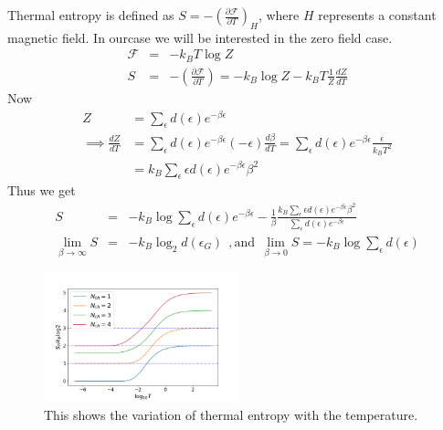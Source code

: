 \documentclass[reprint,prb,superscriptaddress]{revtex4-2}
\begin{document}
Thermal entropy is defined as $S=-(\frac{\partial \mathcal{F}}{\partial T})_H$, where $H$ represents a constant magnetic field. In ourcase we will be interested in the zero field case. 
\begin{eqnarray}
\mathcal{F}&=& -k_B T\log Z \nonumber\\
S &=& -(\frac{\partial \mathcal{F}}{\partial T}) = -k_B \log Z -k_B T \frac{1}{Z} \frac{dZ}{dT}
\end{eqnarray}
Now 
\begin{equation}\begin{aligned}
Z &=\sum_\epsilon  d(\epsilon)e^{-\beta \epsilon}\\
\implies \frac{dZ}{dT} &= \sum_\epsilon d(\epsilon) e^{-\beta \epsilon}  (-\epsilon) \frac{d\beta}{dT} = \sum_\epsilon d(\epsilon) e^{-\beta \epsilon}   \frac{ \epsilon}{k_B T^2}\\
		       &=k_B\sum_\epsilon \epsilon d(\epsilon) e^{-\beta \epsilon} \beta^2   
\end{aligned}\end{equation}
Thus we get
\begin{eqnarray}
S &=& -k_B \log \sum_{\epsilon} d(\epsilon) e^{-\beta \epsilon}  -\frac{1}{\beta} \frac{k_B\sum_\epsilon \epsilon d(\epsilon) e^{-\beta \epsilon} \beta^2   }{\sum_\epsilon  d(\epsilon)e^{-\beta \epsilon}} \nonumber\\
\lim_{\beta\rightarrow \infty} S &=& -k_B \log_2 d(\epsilon_{G})  ~~, \textrm{and}~~ \lim_{\beta\rightarrow 0} S = -k_B \log \sum_\epsilon d(\epsilon) 
\end{eqnarray}
\begin{figure}
\centering
\includegraphics[width=0.5\textwidth]{plt/ThermalEntanglementVS_LogTemperature_}
\caption{This shows the variation of thermal entropy with the temperature.}
\label{fig:thermal_entropy}
\end{figure}
\end{document}
